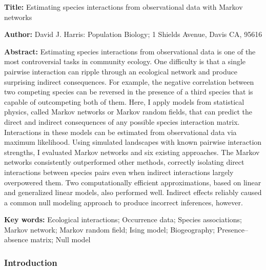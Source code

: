 \renewcommand{\headrulewidth}{0pt}

\setlength{\parskip}{3pt}

\textbf{Title:} Estimating species interactions from observational data
with Markov networks

\textbf{Author:} David J. Harris: Population Biology; 1 Shields Avenue,
Davis CA, 95616

\textbf{Abstract:} Estimating species interactions from observational
data is one of the most controversial tasks in community ecology. One
difficulty is that a single pairwise interaction can ripple through an
ecological network and produce surprising indirect consequences. For
example, the negative correlation between two competing species can be
reversed in the presence of a third species that is capable of
outcompeting both of them. Here, I apply models from statistical
physics, called Markov networks or Markov random fields, that can
predict the direct and indirect consequences of any possible species
interaction matrix. Interactions in these models can be estimated from
observational data via maximum likelihood. Using simulated landscapes
with known pairwise interaction strengths, I evaluated Markov networks
and six existing approaches. The Markov networks consistently
outperformed other methods, correctly isolating direct interactions
between species pairs even when indirect interactions largely
overpowered them. Two computationally efficient approximations, based on
linear and generalized linear models, also performed well. Indirect
effects reliably caused a common null modeling approach to produce
incorrect inferences, however.

\textbf{Key words:} Ecological interactions; Occurrence data; Species
associations; Markov network; Markov random field; Ising model;
Biogeography; Presence--absence matrix; Null model

\subsubsection{Introduction}\label{introduction}

\setlength{\parindent}{1cm}

